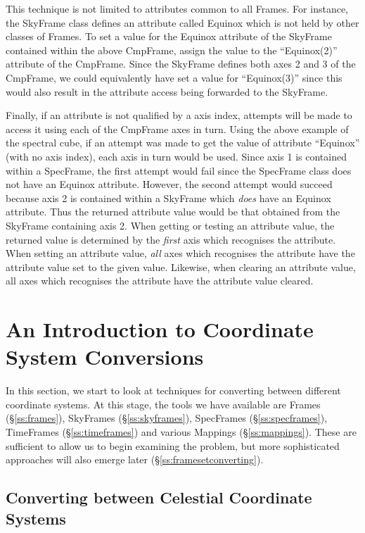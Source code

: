 \documentclass[twoside,11pt]{starlink}
\providecommand{\secref}[1]{\S\ref{#1}}
\begin{document}
This technique is not limited to attributes common to all Frames. For
instance, the SkyFrame class defines an attribute called Equinox which is
not held by other classes of Frames. To set a value for the Equinox
attribute of the SkyFrame contained within the above CmpFrame, assign the
value to the ``Equinox(2)'' attribute of the CmpFrame. Since the SkyFrame
defines both axes 2 and 3 of the CmpFrame, we could equivalently have set
a value for ``Equinox(3)'' since this would also result in the attribute
access being forwarded to the SkyFrame.

Finally, if an attribute is not qualified by a axis index, attempts will
be made to access it using each of the CmpFrame axes in turn. Using the
above example of the spectral cube, if an attempt was made to get the
value of attribute ``Equinox'' (with no axis index), each axis in turn
would be used. Since axis 1 is contained within a SpecFrame, the first
attempt would fail since the SpecFrame class does not have an Equinox
attribute. However, the second attempt would succeed because axis 2 is
contained within a SkyFrame which \emph{does} have an Equinox attribute. Thus
the returned attribute value would be that obtained from the SkyFrame
containing axis 2. When getting or testing an attribute value, the
returned value is determined by the \emph{first} axis which recognises
the attribute. When setting an attribute value, \emph{all} axes
which recognises the attribute have the attribute value set to the given
value. Likewise, when clearing an attribute value, all axes
which recognises the attribute have the attribute value cleared.

\cleardoublepage
\section{\label{ss:introducingconversion}An Introduction to Coordinate System Conversions}

In this section, we start to look at techniques for converting between
different coordinate systems.  At this stage, the tools we have available
are Frames (\secref{ss:frames}), SkyFrames (\secref{ss:skyframes}),
SpecFrames (\secref{ss:specframes}), TimeFrames (\secref{ss:timeframes}) and
various Mappings (\secref{ss:mappings}). These are sufficient to allow us to
begin examining the problem, but more sophisticated approaches will also emerge
later (\secref{ss:framesetconverting}).

\subsection{\label{ss:convertingskyframes}Converting between Celestial Coordinate Systems}
\end{document}

